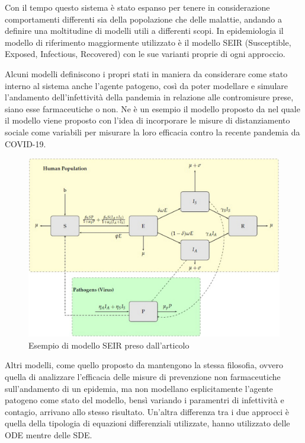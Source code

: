 
Con il tempo questo sistema è stato espanso per tenere in considerazione comportamenti
differenti sia della popolazione che delle malattie, andando a definire una moltitudine
di modelli utili a differenti scopi. In epidemiologia il modello di
riferimento maggiormente utilizzato è il modello SEIR 
(Susceptible, Exposed, Infectious, Recovered)
con le sue varianti proprie di ogni approccio.

Alcuni modelli definiscono i propri stati in maniera da considerare 
come stato interno al sistema anche l'agente patogeno, così da 
poter modellare e simulare l'andamento dell'infettività della pandemia 
in relazione alle contromisure prese, siano esse farmaceutiche o non.
Ne è un esempio il modello proposto da \cite{Mwalili2020} nel quale 
il modello viene proposto con l'idea di incorporare le misure di 
distanziamento sociale come variabili per misurare la loro efficacia
contro la recente pandemia da COVID-19.

\begin{figure}[h]
    \includegraphics[width=\linewidth]{img/13104_2020_5192_Fig1_HTML.png}
    \caption{Esempio di modello SEIR preso dall'articolo \cite{Mwalili2020}}
    \label{fig:SEIR_model_social_distancing}
\end{figure}

Altri modelli, come quello proposto da \cite{ijerph17103535} mantengono 
la stessa filosofia, ovvero quella di analizzare l'efficacia delle misure 
di prevenzione non farmaceutiche sull'andamento di un epidemia, ma non
modellano esplicitamente l'agente patogeno come stato del modello, bensì
variando i paramentri di infettività e contagio, arrivano allo stesso 
risultato. Un'altra differenza tra i due approcci è quella della tipologia
di equazioni differenziali utilizzate, \cite{Mwalili2020} hanno utilizzato 
delle ODE mentre \cite{ijerph17103535} delle SDE.

